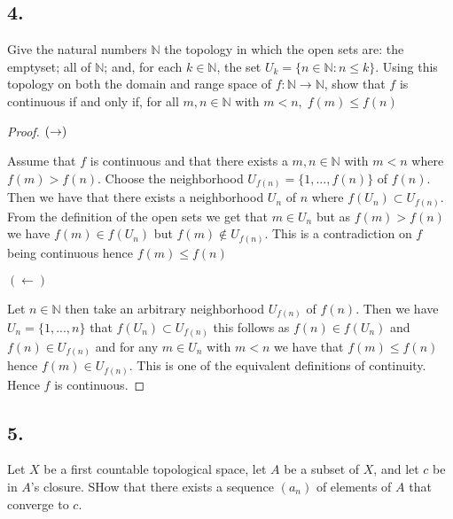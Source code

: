 \documentclass{amsart}
\theoremstyle{plain}
\theoremstyle{definition}
\theoremstyle{remark}
\begin{document}
\subsection*{4.} Give the natural numbers $\mathbb{N}$ the topology in which the open sets are: the emptyset; all of $\mathbb N$; and, for each $k\in \mathbb N$, the set $U_k=\{n\in \mathbb{N}: n\leq k\}$. Using this topology on both the domain and range space of $f:\mathbb N\to \mathbb N$, show that $f$ is continuous if and only if, for all $m,n\in \mathbb{N}$ with $m<n,\; f(m)\leq f(n)$
\begin{proof}


    $\\ (\rightarrow)$


    Assume that $f$ is continuous and that there exists a $m,n\in \mathbb{N}$ with $m<n$ where $f(m)> f(n)$. Choose the neighborhood $U_{f(n)}=\{1,...,f(n)\}$ of $f(n)$. Then we have that there exists a neighborhood $U_n$ of $n$ where $f(U_n)\subset U_{f(n)}$. From the definition of the open sets we get that $m\in U_n$ but as $f(m)> f(n)$ we have $f(m)\in f(U_n)$ but $f(m)\not \in U_{f(n)}$. This is a contradiction on $f$ being continuous hence $f(m)\leq f(n)$

    $(\leftarrow)$


    Let $n\in \mathbb{N}$ then take an arbitrary neighborhood $U_{f(n)}$ of $f(n)$. Then we have $U_{n}=\{1,...,n\}$ that $f(U_n)\subset U_{f(n)}$ this follows as $f(n)\in f(U_n)$ and $f(n)\in U_{f(n)}$ and for any $m\in U_n$ with $m<n$ we have that $f(m)\leq f(n)$ hence $f(m)\in U_{f(n)}$. This is one of the equivalent definitions of continuity. Hence $f$ is continuous.
\end{proof}


\subsection*{5.}
Let $X$ be a first countable topological space, let $A$ be a subset of $X$, and let $c$ be in $A$'s closure. SHow that there exists a sequence $(a_n)$ of elements of $A$ that converge to $c$.
\end{document}
